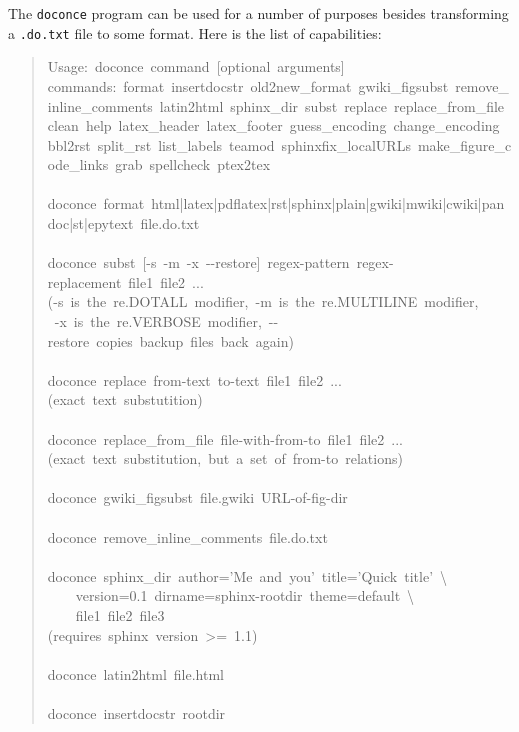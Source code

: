 \documentclass[a4paper]{article}
\begin{document}
The \texttt{doconce} program can be used for a number of purposes besides
transforming a \texttt{.do.txt} file to some format. Here is the
list of capabilities:
%
\begin{quote}{\ttfamily \raggedright \noindent
Usage:~doconce~command~{[}optional~arguments{]}\\
commands:~format~insertdocstr~old2new\_format~gwiki\_figsubst~remove\_inline\_comments~latin2html~sphinx\_dir~subst~replace~replace\_from\_file~clean~help~latex\_header~latex\_footer~guess\_encoding~change\_encoding~bbl2rst~split\_rst~list\_labels~teamod~sphinxfix\_localURLs~make\_figure\_code\_links~grab~spellcheck~ptex2tex\\
~\\
doconce~format~html|latex|pdflatex|rst|sphinx|plain|gwiki|mwiki|cwiki|pandoc|st|epytext~file.do.txt\\
~\\
doconce~subst~{[}-s~-m~-x~-{}-restore{]}~regex-pattern~regex-replacement~file1~file2~...\\
(-s~is~the~re.DOTALL~modifier,~-m~is~the~re.MULTILINE~modifier,\\
~-x~is~the~re.VERBOSE~modifier,~-{}-restore~copies~backup~files~back~again)\\
~\\
doconce~replace~from-text~to-text~file1~file2~...\\
(exact~text~substutition)\\
~\\
doconce~replace\_from\_file~file-with-from-to~file1~file2~...\\
(exact~text~substitution,~but~a~set~of~from-to~relations)\\
~\\
doconce~gwiki\_figsubst~file.gwiki~URL-of-fig-dir\\
~\\
doconce~remove\_inline\_comments~file.do.txt\\
~\\
doconce~sphinx\_dir~author='Me~and~you'~title='Quick~title'~\textbackslash{}\\
~~~~version=0.1~dirname=sphinx-rootdir~theme=default~\textbackslash{}\\
~~~~file1~file2~file3\\
(requires~sphinx~version~>=~1.1)\\
~\\
doconce~latin2html~file.html\\
~\\
doconce~insertdocstr~rootdir\\
}
\end{quote}
\end{document}

